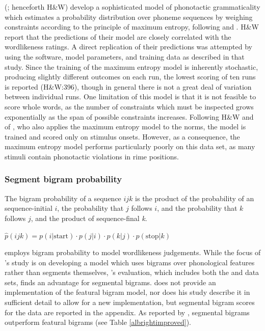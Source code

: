 \citeauthor{Hayes2008a} (\citeyear{Hayes2008a}; henceforth H\&W) develop a sophisticated model of phonotactic grammaticality which estimates a probability distribution over phoneme sequences by weighing constraints according to the principle of maximum entropy, following \citet{Goldwater2003} and \citet{Jager2007}. H\&W report that the predictions of their model are closely correlated with the \citet{Scholes1966} wordlikeness ratings. A direct replication of their predictions was attempted by using the software, model parameters, and training data as described in that study. Since the training of the maximum entropy model is inherently stochastic, producing slightly different outcomes on each run, the lowest scoring of ten runs is reported (H\&W:396), though in general there is not a great deal of variation between individual runs. One limitation of this model is that it is not feasible to score whole words, as the number of constraints which must be inspected grows exponentially as the span of possible constraints increases. Following H\&W and of \citet{Albright2009a}, who also applies the maximum entropy model to the \citet{Albright2003b} norms, the model is trained and scored only on stimulus onsets. However, as a consequence, the maximum entropy model performs particularly poorly on this data set, as many stimuli contain phonotactic violations in rime positions.

\subsubsection{Segment bigram probability} 
\label{bigram}

The bigram probability of a sequence $ijk$ is the product of the probability of an sequence-initial $i$, the probability that $j$ follows $i$, and the probability that $k$ follows $j$, and the product of sequence-final \emph{k}.

\begin{unlabeledexample}
$\displaystyle \hat{p}(ijk) = p(i|\textrm{start}) \cdot p(j|i) \cdot p(k|j) \cdot p(\textrm{stop}|k)$
\end{unlabeledexample}

\noindent \citet{Albright2009a} employs bigram probability to model wordlikeness judgements. While the focus of \citeauthor{Albright2009a}'s study is on developing a model which uses bigrams over phonological features rather than segments themselves, \citeauthor{Albright2009a}'s evaluation, which includes both the \citeauthor{Scholes1966} and \citeauthor{Albright2003b} data sets, finds an advantage for segmental bigrams. \citeauthor{Albright2009a} does not provide an implementation of the featural bigram model, nor does his study describe it in sufficient detail to allow for a new implementation, but segmental bigram scores for the \citeauthor{Albright2003a} data are reported in the appendix. As reported by \citeauthor{Albright2009a}, segmental bigrams outperform featural bigrams (see Table \ref{albrightimproved}).

